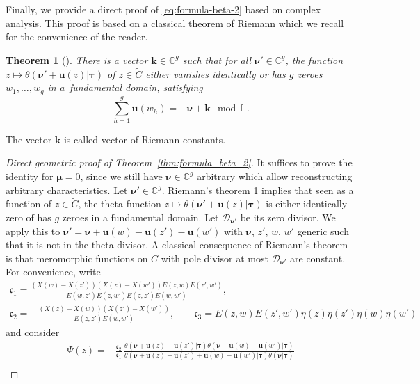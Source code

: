 \documentclass[10pt,a4paper]{amsart}
\numberwithin{equation}{section}
\newtheorem{Theorem}{Theorem}[section]
\newcommand{\C}{\mathbb{C}}
\begin{document}
Finally, we provide a direct proof of \eqref{eq:formula-beta-2} based on complex analysis.
This proof is based on a classical theorem of Riemann which we recall for the
convenience of the reader.

\begin{Theorem}[{\cite[Theorem 3.1]{Tata1}}]\label{thm:Riemann-zero}
 There is a vector $\bm{k} \in \C^{g}$ such that for all
 $\boldsymbol{\nu}' \in \C^{g}$, the function $z \mapsto \theta (\bm{\nu}' + \bm{u}(z) | \bm{\tau} )$ of $z \in \widetilde{C}$ either vanishes identically or has $g$ zeroes $w_1,\ldots,w_g$ in a~fundamental domain, satisfying
\[
\sum_{h=1}^{g}\bm{u}(w_{h}) = - \bm{\nu} + \bm{k} \mod \mathbb{L}.
\]
\end{Theorem}
The vector $\bm{k}$ is called vector of Riemann constants.

\begin{proof}[Direct geometric proof of Theorem~\ref{thm:formula_beta_2}]
It suffices to prove the identity for $\bm{\mu} = 0$, since we still have $\bm{\nu} \in \mathbb{C}^g$ arbitrary which allow reconstructing arbitrary characteristics. Let $\bm{\nu}' \in \C^{g}$. Riemann's
 theorem \ref{thm:Riemann-zero} implies that seen as a function of $z \in \widetilde{C}$, the theta
 function $z \mapsto \theta (\bm{\nu}' + \bm{u}(z) |\bm{\tau} )$ is either identically zero of has $g$ zeroes in a fundamental domain. Let $\mathcal{D}_{\bm{\nu}'}$ be its zero divisor. We apply this to $\bm{\nu}' = \bm{\nu} + \bm{u}(w) - \bm{u}(z') - \bm{u}(w')$ with $\bm{\nu}$, $z'$, $w$, $w'$ generic such that it is not in the theta divisor. A classical consequence of Riemann's theorem
 \cite[Theorem~VI.3.3]{Farkas-Kra} is that meromorphic functions on $C$ with pole divisor at most $\mathcal{D}_{\bm{\nu}'}$ are constant. For convenience, write
 \begin{gather*}
	 \mathfrak{c}_{1} = \frac{(X(w) - X(z'))(X(z) - X(w'))E(z,w)E(z',w')}{E(w,z')E(z,w')E(z,z')E(w,w')},\\
	 \mathfrak{c}_{2} = -\frac{(X(z) - X(w))(X(z') - X(w'))}{E(z,z')E(w,w')},\qquad
	 \mathfrak{c}_{3} = E(z,w)E(z',w')\eta(z)\eta(z')\eta(w)\eta(w')
 \end{gather*}
and consider
\begin{align*}
 \Psi(z) ={}& \frac{\mathfrak{c}_{2}}{\mathfrak{c}_1}\,\frac{\theta(\bm{\nu} + \bm{u}(z) - \bm{u}(z') |\bm{\tau} )\theta (\bm{\nu} + \bm{u}(w) - \bm{u}(w') |\bm{\tau} )}{\theta (\bm{\nu} + \bm{u}(z) - \bm{u}(z') + \bm{u}(w) - \bm{u}(w') |\bm{\tau} )\theta (\bm{\nu} |\bm{\tau} )} \\

\end{align*}
\end{proof}
\end{document}
